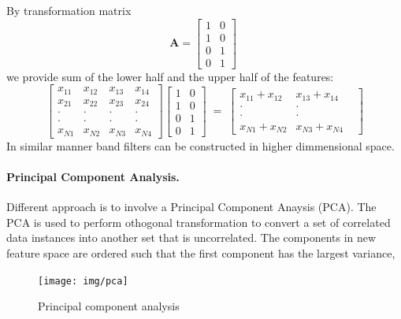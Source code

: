 By transformation matrix 
\begin{equation}
\mathbf{A} = 
\begin{bmatrix}
  1 & 0 \\
  1 & 0 \\
  0 & 1 \\
  0 & 1
 \end{bmatrix}  \;
\end{equation}
we provide sum of the lower half and the upper half of the features:
\begin{equation} 
 \begin{bmatrix}
  x_{11} & x_{12} & x_{13} & x_{14}  \\
  x_{21} & x_{22} & x_{23} & x_{24}  \\
  \cdot & \cdot &\cdot & \cdot  \\
  \cdot & \cdot &\cdot & \cdot  \\
  x_{N1} & x_{N2} & x_{N3} & x_{N4} 
 \end{bmatrix}
\begin{bmatrix}
  1 & 0 \\
  1 & 0 \\
  0 & 1 \\
  0 & 1
 \end{bmatrix}  \;= \;
 \begin{bmatrix}
  x_{11} + x_{12} & x_{13} + x_{14}  \\
  \cdot & \cdot &  \\
  \cdot & \cdot &  \\
  x_{N1} + x_{N2} & x_{N3} + x_{N4} 
 \end{bmatrix}
\end{equation}
In similar manner band filters can be constructed in higher dimmensional space.


\paragraph*{Principal Component Analysis.}
Different approach is to involve a Principal Component Anaysis (PCA). 
The PCA is used to perform othogonal transformation to convert a set of correlated data instances into 
another set that is uncorrelated. The components in new feature space are ordered  
such that the first component has the largest variance, %

\begin{figure}[h!]%
  \centering
  \texttt{[image: img/pca]}
  \caption{\small Principal component analysis}
  \label{fig:pca}
\end{figure}

